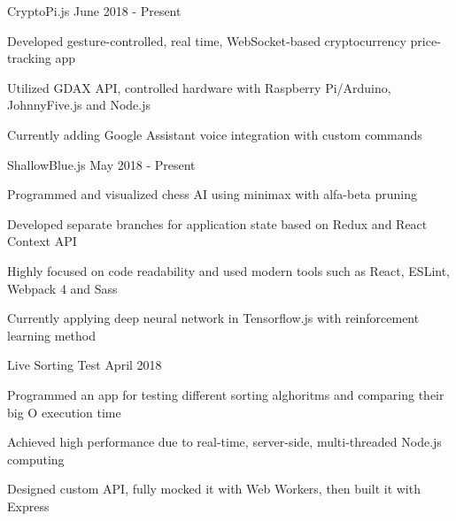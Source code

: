 
\begin{cventries}
  \cventryproject
  {CryptoPi.js} %
  {June 2018 - Present} %
    {
      \begin{cvitems} %
        \item Developed gesture-controlled, real time, WebSocket-based cryptocurrency price-tracking app
        \item Utilized GDAX API, controlled hardware with Raspberry Pi/Arduino, JohnnyFive.js and Node.js
        \item Currently adding Google Assistant voice integration with custom commands
    \end{cvitems}
    }

    \cventryproject
    {ShallowBlue.js} %
    {May 2018 - Present} %
      {
        \begin{cvitems} %
          \item Programmed and visualized chess AI using minimax with alfa-beta pruning
          \item Developed separate branches for application state based on Redux and React Context API
          \item Highly focused on code readability and used modern tools such as React, ESLint, Webpack 4 and Sass
          \item Currently applying deep neural network in Tensorflow.js with reinforcement learning method
      \end{cvitems}
      }

      \cventryproject
      {Live Sorting Test} %
      {April 2018} %
        {
          \begin{cvitems} %
            \item Programmed an app for testing different sorting alghoritms and comparing their big O execution time
            \item Achieved high performance due to real-time, server-side, multi-threaded Node.js computing
            \item Designed custom API, fully mocked it with Web Workers, then built it with Express
        \end{cvitems}
        }


\end{cventries}
